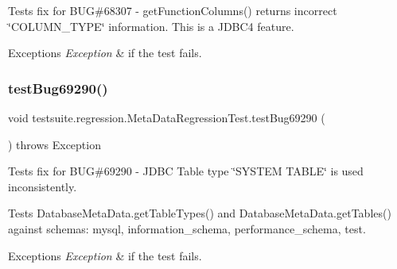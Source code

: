 Tests fix for B\+UG\#68307 -\/ get\+Function\+Columns() returns incorrect \char`\"{}\+C\+O\+L\+U\+M\+N\+\_\+\+T\+Y\+P\+E\char`\"{} information. This is a J\+D\+B\+C4 feature.


\begin{DoxyExceptions}{Exceptions}
{\em Exception} & if the test fails. \\
\hline
\end{DoxyExceptions}
\mbox{\label{classtestsuite_1_1regression_1_1_meta_data_regression_test_a415c490c795a8501bb347c435a223360}} 
\subsubsection{\texorpdfstring{test\+Bug69290()}{testBug69290()}}
{\footnotesize\ttfamily void testsuite.\+regression.\+Meta\+Data\+Regression\+Test.\+test\+Bug69290 (\begin{DoxyParamCaption}{ }\end{DoxyParamCaption}) throws Exception}

Tests fix for B\+UG\#69290 -\/ J\+D\+BC Table type \char`\"{}\+S\+Y\+S\+T\+E\+M T\+A\+B\+L\+E\char`\"{} is used inconsistently.

Tests Database\+Meta\+Data.\+get\+Table\+Types() and Database\+Meta\+Data.\+get\+Tables() against schemas\+: mysql, information\+\_\+schema, performance\+\_\+schema, test.


\begin{DoxyExceptions}{Exceptions}
{\em Exception} & if the test fails. \\
\hline
\end{DoxyExceptions}
\mbox{\label{classtestsuite_1_1regression_1_1_meta_data_regression_test_a1367bf2ebe3a308c3d374e28648699fc}} 
